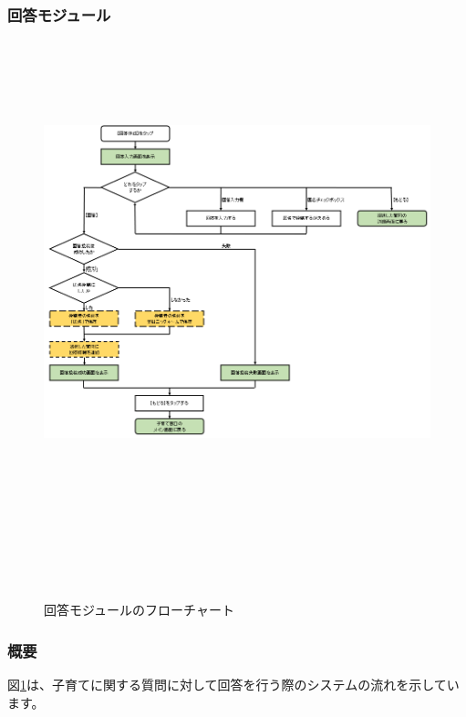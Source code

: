 \documentclass[a4j]{jarticle}
\begin{document}
\subsubsection{回答モジュール\label{回答}} %
\begin{figure}[H]
    \begin{center}
      \includegraphics[height = 14.0cm] {子育て窓口_回答.png} %
    \caption {回答モジュールのフローチャート}
    \label{子育て窓口_回答}　
    \end{center}　
\end{figure}
\subsubsection*{概要}
図\ref{子育て窓口_回答}は、子育てに関する質問に対して回答を行う際のシステムの流れを示しています。
\end{document}
